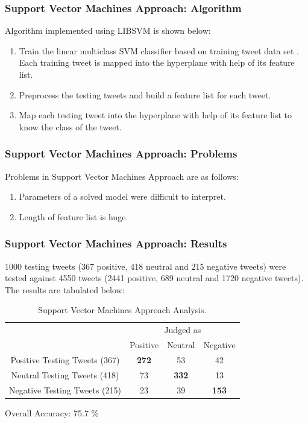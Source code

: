 \documentclass[12pt,xcolor=dvipsnames,table,titlepage]{beamer}
\begin{document}
\begin{frame}[t]
\frametitle{Support Vector Machines Approach: Algorithm}
Algorithm implemented using LIBSVM is shown below:
\begin{enumerate}
 \item Train the linear multiclass SVM classifier based on training tweet data set \cite{dataset}. 
 Each training tweet is mapped into the hyperplane with help of its feature list.
 \item Preprocess the testing tweets and build a feature list for each tweet.
 \item Map each testing tweet into the hyperplane with help of its feature list to know the class of the tweet.
\end{enumerate}
\end{frame}

\begin{frame}[t]
\frametitle{Support Vector Machines Approach: Problems}
Problems in Support Vector Machines Approach are as follows:
\begin{enumerate}
 \item Parameters of a solved model were difficult to interpret.
 \item Length of feature list is huge.
\end{enumerate}
\end{frame}

\begin{frame}[t]
\frametitle{Support Vector Machines Approach: Results}
1000 testing tweets (367 positive, 418 neutral and 215 negative tweets) were tested against 4550 tweets (2441 positive, 689 neutral and 1720 negative tweets). The results are tabulated below:\\
\begin{table}[h]
\begin{tabular}{c|c|c|c|}
\cline{2-4}
                                                  & \multicolumn{3}{c|}{Judged as}                                                                                   \\ \cline{2-4} 
\multirow{-2}{*}{}                                & Positive                           & Neutral                              & Negative                             \\ \hline
\multicolumn{1}{|c|}{Positive Testing Tweets (367)} & {\color[HTML]{036400} \textbf{272}} & {\color[HTML]{680100} 53}            & {\color[HTML]{680100} 42}            \\ \hline
\multicolumn{1}{|c|}{Neutral Testing Tweets (418)}  & {\color[HTML]{680100} 73}        & {\color[HTML]{036400} \textbf{332}} & {\color[HTML]{680100} 13}          \\ \hline
\multicolumn{1}{|c|}{Negative Testing Tweets (215)} & {\color[HTML]{680100} 23}        & {\color[HTML]{680100} 39}          & {\color[HTML]{036400} \textbf{153}} \\ \hline
\end{tabular}
\caption{Support Vector Machines Approach Analysis.}
Overall Accuracy: 75.7 \%
\par\smallskip
\end{table}
\end{frame}
\end{document}
